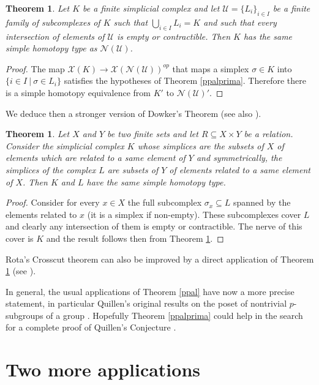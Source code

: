 \documentclass[11pt,twoside]{amsart}
\theoremstyle{plain}
\newtheorem{teo}[lema]{Theorem}
\theoremstyle{remark}
\theoremstyle{definition}
\newcommand{\x}{\mathcal{X}}
\begin{document}
\begin{teo} \label{nerveprima}
Let $K$ be a finite simplicial complex and let $\mathcal{U}=\{L_i\}_{i\in I}$ be a finite family of subcomplexes of $K$ such that $\bigcup\limits_{i\in I} L_i=K$ and such that every intersection of elements of $\mathcal{U}$ is empty or contractible. Then $K$ has the same simple homotopy type as $\mathcal{N}(\mathcal{U})$.
\end{teo}
\begin{proof}
The map $\x (K) \to \x (\mathcal{N}(\mathcal{U})) ^{op}$ that maps a simplex $\sigma \in K$ into $\{i \in I \ | \ \sigma \in L_i\}$ satisfies the hypotheses of Theorem \ref{ppalprima}. Therefore there is a simple homotopy equivalence from $K'$ to $\mathcal{N}(\mathcal{U})'$.
\end{proof}

We deduce then a stronger version of Dowker's Theorem \cite{Dow} (see also \cite[Theorem 10.9]{Bjo}).

\begin{teo}
Let $X$ and $Y$ be two finite sets and let $R\subseteq X\times Y$ be a relation. Consider the simplicial complex $K$ whose simplices are the subsets of $X$ of elements which are related to a same element of $Y$ and symmetrically, the simplices of the complex $L$ are subsets of $Y$ of elements related to a same element of $X$. Then $K$ and $L$ have the same simple homotopy type.  
\end{teo}
\begin{proof}
Consider for every $x\in X$ the full subcomplex $\sigma _x \subseteq L$ spanned by the elements related to $x$ (it is a simplex if non-empty). These subcomplexes cover $L$ and clearly any intersection of them is empty or contractible. The nerve of this cover is $K$ and the result follows then from Theorem \ref{nerveprima}. 
\end{proof}

Rota's Crosscut theorem can also be improved by a direct application of Theorem \ref{nerveprima} (see \cite[Theorem 10.8]{Bjo}). 

In general, the usual applications of Theorem \ref{ppal} have now a more precise statement, in particular Quillen's original results on the poset of nontrivial $p$-subgroups of a group \cite{Qui}. Hopefully Theorem \ref{ppalprima} could help in the search for a complete proof of Quillen's Conjecture \cite[Conjecture 2.9]{Qui}. 

\section{Two more applications}
\end{document}
